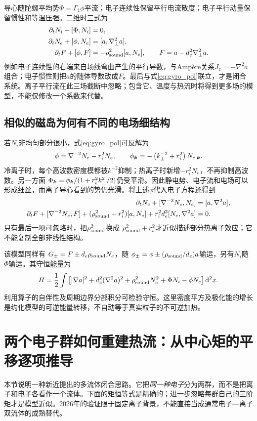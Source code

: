 导心随陀螺平均势$\Phi=\Gamma_1\phi$平流；电子连续性保留平行电流散度；电子平行动量保留惯性和等温压强。二维时三式为
\begin{align}
 \partial_tN_i+[\Phi,N_i]&=0,\\
 \partial_tN_e+[\phi,N_e]&=[a,\nabla_\perp^2a],\\
 \partial_tF+[\phi,F]&=-\rho_{\rm sound}^2[a,N_e],
 \qquad F=a-d_e^2\nabla_\perp^2a.
\end{align}
例如电子连续性的右端来自场线弯曲产生的平行导数，与Ampère关系$J_z=-\nabla^2a$组合；电子惯性则把$a$的随体导数改成$F$。最后与式\eqref{eq:gyro_pol}联立，才是闭合系统。离子平行流在此三场截断中忽略；包含它、温度与热流时将得到更多场的模型，不能仅修改一个系数来代替。

\subsection{相似的磁岛为何有不同的电场细结构}
若$N_i$非均匀部分很小，式\eqref{eq:gyro_pol}可反解为
\begin{equation}
 \phi=\nabla^{-2}N_e-r_i^2N_e,
 \qquad \phi_{\bm{k}}=-\left(k_\perp^{-2}+r_i^2\right)N_{e,\bm{k}}.
\end{equation}
冷离子时，每个高波数密度模都被$k^{-2}$抑制；热离子时新增$-r_i^2N_e$，不再抑制高波数。另一方面
$\Phi_{\bm{k}}=\phi_{\bm{k}}/(1+r_i^2k_\perp^2/2)$仍受平滑。因此静电势、电子流和电场可以形成细丝，而离子导心看到的势仍光滑。将上述$\phi$代入电子方程还得到
\begin{align}
 \partial_tN_e+[\nabla^{-2}N_e,N_e]&=[a,\nabla^2a],\\
 \partial_tF+[\nabla^{-2}N_e,F]
 +(\rho_{\rm sound}^2+r_i^2)[a,N_e]
 +r_i^2d_e^2[N_e,\nabla^2a]&=0.
\end{align}
只有最后一项可忽略时，把$\rho_{\rm sound}^2$换成
$\rho_{\rm sound}^2+r_i^2$才近似描述部分热离子效应；它不能复制全部非线性结构。

该模型同样有
$G_\pm=F\pm d_e\rho_{\rm sound}N_e$，随
$\phi_\pm=\phi\pm(\rho_{\rm sound}/d_e)a$输运，另有$N_i$随$\Phi$输运。其守恒能量为
\begin{equation}
 H=\frac12\int\left[|\nabla a|^2+d_e^2(\nabla^2a)^2
 +\rho_{\rm sound}^2N_e^2+\Phi N_i-\phi N_e\right]\mathrm d^2x.
\end{equation}
利用算子的自伴性及周期边界分部积分可检验守恒。这里密度平方及极化能的增长是约化模型的可逆能量转移，不自动等于真实粒子的不可逆加热。\citep{E469}



\section{两个电子群如何重建热流：从中心矩的平移逐项推导}
本节说明一种新近提出的多流体闭合思路。它把\emph{同一种电子}分为两群，而不是把离子和电子各看作一个流体。下面的矩恒等式是精确的；进一步忽略每群自己的三阶矩才是模型近似。2026年的验证限于固定离子背景，不能直接当成通常电子—离子双流体的成熟替代。\citep{F635}

